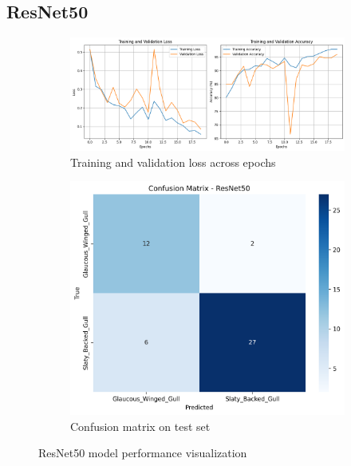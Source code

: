 \documentclass[a4paper,12pt]{report}
\begin{document}
\subsection{ResNet50}
\begin{figure}[H]
    \centering
    \begin{subfigure}[b]{0.48\textwidth}
        \centering
        \includegraphics[width=\textwidth]{images/appendix/modelgraph/resnet/resnet.png}
        \caption{Training and validation loss across epochs}
        \label{fig:resnet_training}
    \end{subfigure}
    \hfill
    \begin{subfigure}[b]{0.48\textwidth}
        \centering
        \includegraphics[width=\textwidth]{images/appendix/modelgraph/resnet/resnet50_confusion_matrix.png}
        \caption{Confusion matrix on test set}
        \label{fig:resnet_confusion}
    \end{subfigure}
    \caption{ResNet50 model performance visualization}
    \label{fig:resnet_performance}
\end{figure}
\end{document}

